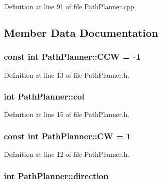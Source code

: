 Definition at line 91 of file Path\-Planner.\-cpp.



\subsection{Member Data Documentation}
\hypertarget{classPathPlanner_ab08a4cb0f762a4401a804bf0ce1bbbe6}{
\subsubsection[{C\-C\-W}]{\setlength{\rightskip}{0pt plus 5cm}const int Path\-Planner\-::\-C\-C\-W = -\/1\hspace{0.3cm}{\ttfamily [static]}}}\label{classPathPlanner_ab08a4cb0f762a4401a804bf0ce1bbbe6}


Definition at line 13 of file Path\-Planner.\-h.

\hypertarget{classPathPlanner_a20d2bf800c63aacfd1af314ad400d119}{
\subsubsection[{col}]{\setlength{\rightskip}{0pt plus 5cm}int Path\-Planner\-::col\hspace{0.3cm}{\ttfamily [private]}}}\label{classPathPlanner_a20d2bf800c63aacfd1af314ad400d119}


Definition at line 15 of file Path\-Planner.\-h.

\hypertarget{classPathPlanner_af08949a4cd572b26f4f37ff441191b3a}{
\subsubsection[{C\-W}]{\setlength{\rightskip}{0pt plus 5cm}const int Path\-Planner\-::\-C\-W = 1\hspace{0.3cm}{\ttfamily [static]}}}\label{classPathPlanner_af08949a4cd572b26f4f37ff441191b3a}


Definition at line 12 of file Path\-Planner.\-h.

\hypertarget{classPathPlanner_a1f9985b79ca49ca0b2992176a10a6210}{
\subsubsection[{direction}]{\setlength{\rightskip}{0pt plus 5cm}int Path\-Planner\-::direction\hspace{0.3cm}{\ttfamily [private]}}}\label{classPathPlanner_a1f9985b79ca49ca0b2992176a10a6210}


